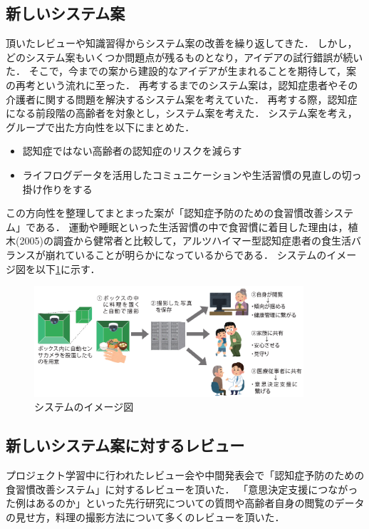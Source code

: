 \documentclass[../report]{subfiles}
\begin{document}
\subsection{新しいシステム案}
頂いたレビューや知識習得からシステム案の改善を繰り返してきた．
しかし，どのシステム案もいくつか問題点が残るものとなり，アイデアの試行錯誤が続いた．
そこで，今までの案から建設的なアイデアが生まれることを期待して，案の再考という流れに至った．
再考するまでのシステム案は，認知症患者やその介護者に関する問題を解決するシステム案を考えていた．
再考する際，認知症になる前段階の高齢者を対象とし，システム案を考えた．
システム案を考え，グループで出た方向性を以下にまとめた．
\begin{itemize}
    \item 認知症ではない高齢者の認知症のリスクを減らす
    \item ライフログデータを活用したコミュニケーションや生活習慣の見直しの切っ掛け作りをする
\end{itemize}
この方向性を整理してまとまった案が「認知症予防のための食習慣改善システム」である．
運動や睡眠といった生活習慣の中で食習慣に着目した理由は，植木(2005)の調査から健常者と比較して，アルツハイマー型認知症患者の食生活バランスが崩れていることが明らかになっている\cite{ueki}からである．
システムのイメージ図を以下\ref{fig:sys-image}に示す．
\begin{figure}[htbp]
    \begin{center}
        \includegraphics[width=10cm]{imgs/system-overview.png}
        \caption{システムのイメージ図}
        \label{fig:sys-image}
    \end{center}
\end{figure}

\subsection{新しいシステム案に対するレビュー}
プロジェクト学習中に行われたレビュー会や中間発表会で「認知症予防のための食習慣改善システム」に対するレビューを頂いた．
「意思決定支援につながった例はあるのか」といった先行研究についての質問や高齢者自身の閲覧のデータの見せ方，料理の撮影方法について多くのレビューを頂いた．
\end{document}
